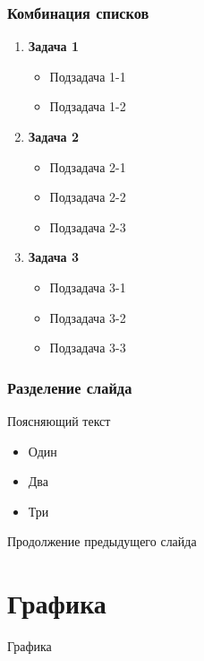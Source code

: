 \begin{frame}
    \frametitle{Комбинация списков}
    \begin{enumerate}
        \item \textbf{Задача 1}
              \begin{itemize}
                  \item Подзадача 1-1
                  \item Подзадача 1-2
              \end{itemize}
        \item \textbf{Задача 2}
              \begin{itemize}
                  \item Подзадача 2-1
                  \item Подзадача 2-2
                  \item Подзадача 2-3
              \end{itemize}
        \item \textbf{Задача 3}
              \begin{itemize}
                  \item Подзадача 3-1
                  \item Подзадача 3-2
                  \item Подзадача 3-3
              \end{itemize}
    \end{enumerate}
\end{frame}

\begin{frame}[allowframebreaks]
    \frametitle{Разделение слайда}
    Поясняющий текст
    \begin{itemize}
        \item Один
        \item Два
        \item Три
    \end{itemize}
    \framebreak
    Продолжение предыдущего слайда
\end{frame}

\section{Графика}
\begin{frame}
    \begin{center}
        \Huge
        Графика
    \end{center}
\end{frame}


